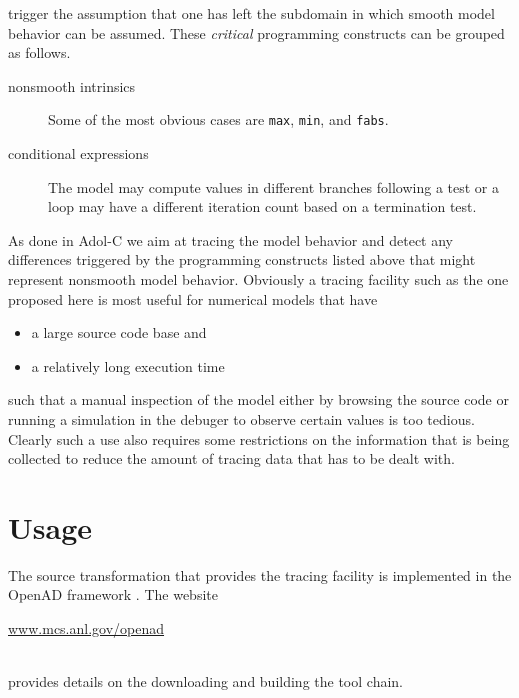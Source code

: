\documentclass{article}
\newcommand{\code}[1]{{\tt{#1}}}
\begin{document}
trigger the assumption that one has left the subdomain in which smooth model behavior 
can be assumed. 
These {\em critical} programming constructs can be grouped as follows.
\begin{description}
\item[nonsmooth intrinsics] Some of the most obvious cases are \code{max}, \code{min}, and \code{fabs}.
\item[conditional expressions] The model may compute values in different branches following a test 
or a loop may have a different iteration count based on a termination test.
\end{description}
As done in Adol-C we aim at tracing the model behavior and detect any differences triggered 
by the programming constructs listed above that might represent nonsmooth model behavior.
Obviously a tracing facility such as the one proposed here is most useful for 
numerical models that have 
\begin{itemize}
\item a large source code base and 
\item a relatively long execution time
\end{itemize}
such that a manual inspection of the model either by browsing the source code or 
running a simulation in the debuger to observe certain values is too tedious.
Clearly such a use also requires some restrictions on the information that is being 
collected to reduce the amount of tracing data that has to be dealt with.


\section{Usage}

The source transformation that provides the tracing facility is implemented in the 
OpenAD framework \cite{openad}. The website\\ 
\centerline{\url{www.mcs.anl.gov/openad}}\\
provides details on the downloading and building the tool chain. 
\end{document}

